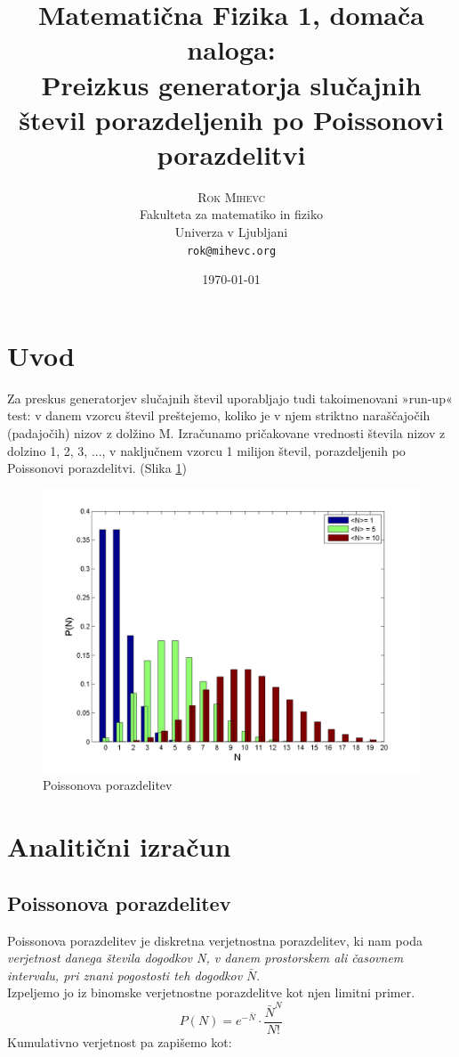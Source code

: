 \documentclass{article}[12pt]
\title{Matematična Fizika 1, domača naloga:\\
Preizkus generatorja slučajnih števil porazdeljenih po Poissonovi porazdelitvi}
\author{
     \textsc{Rok Mihevc} \\[0.25em]
     {\small{Fakulteta za matematiko in fiziko}} \\[-0.25em]
     {\small{Univerza v Ljubljani}} \\[-0.25em]
     {\small\texttt{rok@mihevc.org}}
     }
\date{\today}
\begin{document}
\maketitle


\section{Uvod}

Za preskus generatorjev slučajnih števil uporabljajo tudi takoimenovani »run-up« test: v danem vzorcu števil preštejemo, koliko je v njem striktno naraščajočih (padajočih) nizov z dolžino M. Izračunamo pričakovane vrednosti števila nizov z dolzino 1, 2, 3, ..., v naključnem vzorcu 1 milijon števil, porazdeljenih po Poissonovi porazdelitvi. (Slika \ref{plot1})

\begin{figure}[h]
\begin{center}
\includegraphics[width=17cm]{slike/plot1}
\caption{Poissonova porazdelitev}
\label{plot1}
\end{center}
\end{figure}

\section{Analitični izračun}

\subsection{Poissonova porazdelitev}

Poissonova porazdelitev je diskretna verjetnostna porazdelitev, ki nam poda \textit{verjetnost danega števila dogodkov N, v danem prostorskem ali časovnem intervalu, pri znani pogostosti teh dogodkov $\bar{N}$}.\\
Izpeljemo jo iz binomske verjetnostne porazdelitve kot njen limitni primer.\\
\[ 
P(N) = e^{-\bar{N}} \cdot \frac{\bar{N}^N}{N!}
\]
Kumulativno verjetnost pa zapišemo kot:
\end{document}
